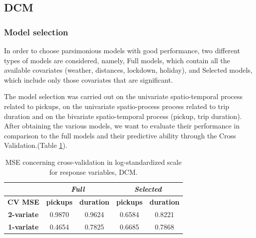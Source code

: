 \subsection{DCM}

\subsubsection{Model selection}
In order to choose  parsimonious models with good performance, two different types of models are considered, namely, Full models, which contain all the available covariates (weather, distances, lockdown, holiday), and Selected models, which include only those covariates that are significant. 

The model selection was carried out on the univariate spatio-temporal process related to pickups, on the univariate spatio-process process related to trip duration and on the bivariate spatio-temporal process (pickup, trip duration).
After obtaining the various models, we want to evaluate their performance in comparison to the full models and their predictive ability through the Cross Validation.(Table \ref{Cross-validation mean squared errors DCM}).

\begin{table}
	\centering
	\renewcommand\arraystretch{1.3}
	\begin{tabular}{c|cc|cc}
		\hline
		\multicolumn{1}{l|}{} & \multicolumn{2}{c|}{\textit{Full}} & \multicolumn{2}{c}{\textit{Selected} }\\ 
		\hline
		\textbf{CV MSE} & \multicolumn{1}{c|}{\textbf{pickups }} & \textbf{duration} & \multicolumn{1}{c|}{\textbf{pickups}} & \textbf{duration} \\ 
		\hline
		\textbf{2-variate } & \multicolumn{1}{c|}{0.9870}  & 0.9624   & \multicolumn{1}{c|}{0.6584}  & 0.8221   \\ 
		\hline
		\textbf{1-variate } & \multicolumn{1}{c|}{0.4654}  & 0.7825   & \multicolumn{1}{c|}{0.6685}  & 0.7868   \\ 
		\hline
	\end{tabular}
	\caption[MSE concerning cross-validation in log-standardized scale for response variables (DCM)]{MSE concerning cross-validation in log-standardized scale for response variables, DCM.}
	\label{Cross-validation mean squared errors DCM}
\end{table}

